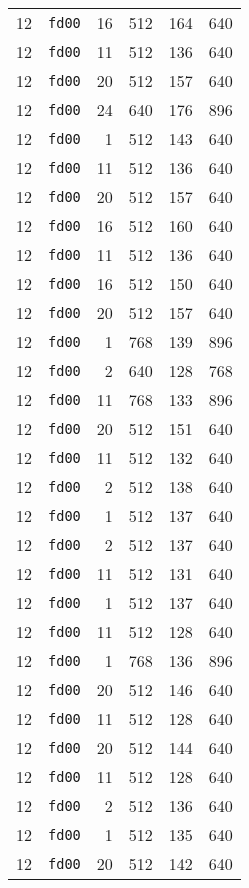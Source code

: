 \documentclass{article}
\begin{document}
\begin{table}[h!]
\begin{tabular}{llrrrl}
    12 & \texttt{fd00} & 16 & 512 & 164 & 640 \\
    12 & \texttt{fd00} & 11 & 512 & 136 & 640 \\
    12 & \texttt{fd00} & 20 & 512 & 157 & 640 \\
    12 & \texttt{fd00} & 24 & 640 & 176 & 896 \\
    12 & \texttt{fd00} & 1 & 512 & 143 & 640 \\
    12 & \texttt{fd00} & 11 & 512 & 136 & 640 \\
    12 & \texttt{fd00} & 20 & 512 & 157 & 640 \\
    12 & \texttt{fd00} & 16 & 512 & 160 & 640 \\
    12 & \texttt{fd00} & 11 & 512 & 136 & 640 \\
    12 & \texttt{fd00} & 16 & 512 & 150 & 640 \\
    12 & \texttt{fd00} & 20 & 512 & 157 & 640 \\
    12 & \texttt{fd00} & 1 & 768 & 139 & 896 \\
    12 & \texttt{fd00} & 2 & 640 & 128 & 768 \\
    12 & \texttt{fd00} & 11 & 768 & 133 & 896 \\
    12 & \texttt{fd00} & 20 & 512 & 151 & 640 \\
    12 & \texttt{fd00} & 11 & 512 & 132 & 640 \\
    12 & \texttt{fd00} & 2 & 512 & 138 & 640 \\
    12 & \texttt{fd00} & 1 & 512 & 137 & 640 \\
    12 & \texttt{fd00} & 2 & 512 & 137 & 640 \\
    12 & \texttt{fd00} & 11 & 512 & 131 & 640 \\
    12 & \texttt{fd00} & 1 & 512 & 137 & 640 \\
    12 & \texttt{fd00} & 11 & 512 & 128 & 640 \\
    12 & \texttt{fd00} & 1 & 768 & 136 & 896 \\
    12 & \texttt{fd00} & 20 & 512 & 146 & 640 \\
    12 & \texttt{fd00} & 11 & 512 & 128 & 640 \\
    12 & \texttt{fd00} & 20 & 512 & 144 & 640 \\
    12 & \texttt{fd00} & 11 & 512 & 128 & 640 \\
    12 & \texttt{fd00} & 2 & 512 & 136 & 640 \\
    12 & \texttt{fd00} & 1 & 512 & 135 & 640 \\
    12 & \texttt{fd00} & 20 & 512 & 142 & 640 \\

\end{tabular}
\end{table}
\end{document}
